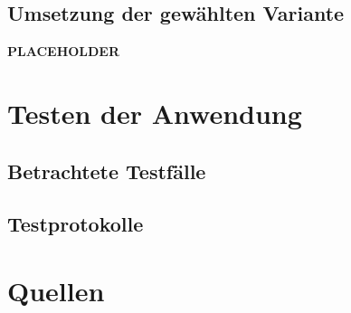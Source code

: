 \documentclass{article}
\begin{document}
\subsection{Umsetzung der gewählten Variante}

    \textbf{PLACEHOLDER}%

\newpage
\section{Testen der Anwendung}

\subsection{Betrachtete Testfälle}


\subsection{Testprotokolle}


\newpage
\section{Quellen}


\end{document}
